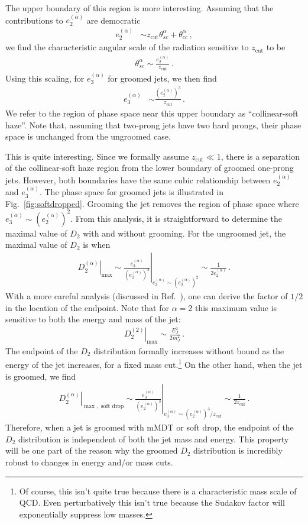 \documentclass[a4paper,11pt]{article}
\newcommand{\ecf}[2]{e_{#1}^{(#2)}}
\def\zcut{z_{\text{cut}}}
\newcommand{\Dobs}[2]{D_{#1}^{(#2)}}
\DeclareRobustCommand{\Fig}[1]{Fig.~\ref{#1}}
\DeclareRobustCommand{\Ref}[1]{Ref.~\cite{#1}}
\begin{document}
The upper boundary of this region is more interesting.  Assuming that the contributions to $\ecf{2}{\alpha}$ are democratic
\begin{align}
\ecf{2}{\alpha} &\sim \zcut \theta_{sc}^\alpha +\theta_{cc}^\alpha\,,
\end{align}
we find the characteristic angular scale of the radiation sensitive to $\zcut$ to be
\begin{align}
\theta_{sc}^\alpha \sim \frac{\ecf{2}{\alpha}}{ \zcut  }\,.
\end{align}
Using this scaling, for $\ecf{3}{\alpha}$ for groomed jets, we then find
\begin{align}
\ecf{3}{\alpha}
&\sim \frac{(\ecf{2}{\alpha})^3}{\zcut}\,.
\end{align}
We refer to the region of phase space near this upper boundary as ``collinear-soft haze''.  Note that, assuming that two-prong jets have two hard prongs, their phase space is unchanged from the ungroomed case.



This is quite interesting. Since we formally assume $\zcut \ll 1$, there is a separation of the collinear-soft haze region from the lower boundary of groomed one-prong jets.  However, both boundaries have the same cubic relationship between
$\ecf{2}{\alpha}$ and $\ecf{3}{\alpha}$. 
The phase space for groomed jets is illustrated in \Fig{fig:softdropped}. 
Grooming the jet removes the region of phase space where $\ecf{3}{\alpha}\sim(\ecf{2}{\alpha})^2$.  From this analysis, it is straightforward to determine the maximal value of $D_2$ with and without grooming.
For the ungroomed jet, the maximal value of $D_2$ is when
\begin{align}
\left.\Dobs{2}{\alpha}\right|_{\max}\sim \left.\frac{\ecf{3}{\alpha}}{(\ecf{2}{\alpha})^3}\right|_{\ecf{3}{\alpha}\sim(\ecf{2}{\alpha})^2} \sim \frac{1}{2\ecf{2}{\alpha}}\,.
\end{align}
With a more careful analysis (discussed in \Ref{Larkoski:2014gra}), one can derive the factor of $1/2$ in the location of the endpoint.  Note that for $\alpha=2$ this maximum value is sensitive to both the energy and mass of the jet:
\begin{align}
\left.\Dobs{2}{2}\right|_{\max}\sim \frac{E_J^2}{2m_J^2}\,.
\end{align}
The endpoint of the $D_2$ distribution formally increases without bound as the energy of the jet increases, for a fixed mass cut.\footnote{Of course, this isn't quite true because there is a characteristic mass scale of QCD.  Even perturbatively this isn't true because the Sudakov factor will exponentially suppress low masses.}
On the other hand, when the jet is groomed, we find
\begin{align}
\left.\Dobs{2}{\alpha}\right|_{\max, \text{ soft drop}}\sim \left.\frac{\ecf{3}{\alpha}}{(\ecf{2}{\alpha})^3}\right|_{\ecf{3}{\alpha}\sim(\ecf{2}{\alpha})^3/\zcut} \sim \frac{1}{2\zcut}\,.
\end{align}
Therefore, when a jet is groomed with mMDT or soft drop, the endpoint of the $D_2$ distribution is independent of both the jet mass and energy.  This property will be one part of the reason why the groomed $D_2$ distribution is incredibly robust to changes in energy and/or mass cuts.
\end{document}
